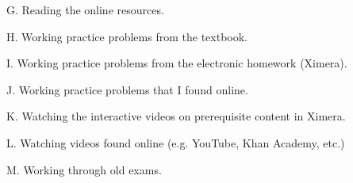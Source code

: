 \documentclass{ximera}
\begin{document}
\begin{question}
\begin{question}
    G. Reading the online resources.
    \begin{multipleChoice}
    \end{multipleChoice}
\end{question}

\begin{question}
    H. Working practice problems from the textbook.
    \begin{multipleChoice}
    \end{multipleChoice}
\end{question}

\begin{question}
    I. Working practice problems from the electronic homework (Ximera).
    \begin{multipleChoice}
    \end{multipleChoice}
\end{question}

\begin{question}
    J. Working practice problems that I found online.
    \begin{multipleChoice}
    \end{multipleChoice}
\end{question}

\begin{question}
    K. Watching the interactive videos on prerequisite content in Ximera.
    \begin{multipleChoice}
    \end{multipleChoice}
\end{question}

\begin{question}
    L. Watching videos found online (e.g. YouTube, Khan Academy, etc.)
    \begin{multipleChoice}
    \end{multipleChoice}
\end{question}

\begin{question}
    M. Working through old exams.
    \begin{multipleChoice}
    \end{multipleChoice}
\end{question}


\end{question}
\end{document}
